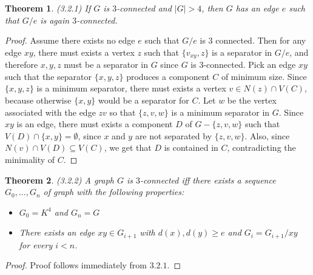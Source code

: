 \documentclass[12pt]{article}
\newtheorem{theorem}{Theorem}
\begin{document}
\begin{theorem} (3.2.1) If $G$ is $3$-connected and $|G| > 4$, then
  $G$ has an edge $e$ such that $G/e$ is again $3$-connected.
\end{theorem}
\begin{proof} Assume there exists no edge $e$ such that $G/e$ is $3$
  connected. Then for any edge $xy$, there must exists a vertex $z$
  such that $\{v_{xy}, z\}$ is a separator in $G/e$, and therefore
  ${x,y,z}$ must be a separator in $G$ since $G$ is
  $3$-connected. Pick an edge $xy$ such that the separator $\{x,y,z\}$
  produces a component $C$ of minimum size. Since $\{x,y,z\}$ is a
  minimum separator, there must exists a vertex
  $v \in N(z) \cap V(C)$, because otherwise $\{x,y\}$ would be a
  separator for $C$. Let $w$ be the vertex associated with the edge
  $zv$ so that $\{z, v, w\}$ is a minimum separator in $G$. Since $xy$
  is an edge, there must exists a component $D$ of $G - \{z,v,w\}$
  such that $V(D) \cap \{x,y\} = \emptyset$, since $x$ and $y$ are not
  separated by $\{z, v, w\}$. Also, since
  $N(v) \cap V(D) \subseteq V(C)$, we get that $D$ is contained in
  $C$, contradicting the minimality of $C$.
\end{proof}

\begin{theorem} (3.2.2) A graph $G$ is $3$-connected iff there exists
  a sequence $G_0, \ldots, G_n$ of graph with the following
  properties:
  \begin{itemize}
  \item[(i)] $G_0 = K^4$ and $G_n = G$
  \item[(ii)] There exists an edge $xy \in G_{i+1}$ with
    $d(x), d(y) \geq e$ and $G_i = G_{i + 1} /xy$ for every $i < n$.
  \end{itemize}
\end{theorem}
\begin{proof} Proof follows immediately from $3.2.1$.
\end{proof}
\end{document}
